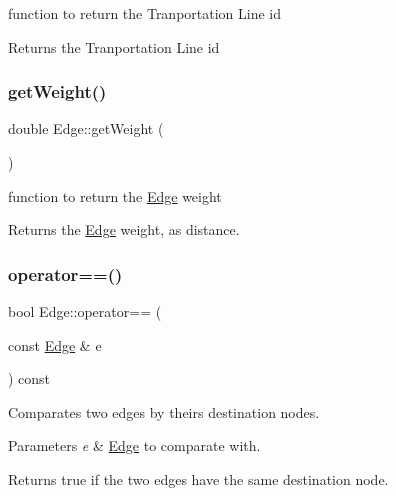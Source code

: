 function to return the Tranportation Line id 

\begin{DoxyReturn}{Returns}
the Tranportation Line id 
\end{DoxyReturn}
\mbox{\label{class_edge_a3a776c1ccafacdbdb10fdedd9cb329af}} 
\subsubsection{\texorpdfstring{get\+Weight()}{getWeight()}}
{\footnotesize\ttfamily double Edge\+::get\+Weight (\begin{DoxyParamCaption}{ }\end{DoxyParamCaption})\hspace{0.3cm}{\ttfamily [inline]}}



function to return the \hyperlink{class_edge}{Edge} weight 

\begin{DoxyReturn}{Returns}
the \hyperlink{class_edge}{Edge} weight, as distance. 
\end{DoxyReturn}
\mbox{\label{class_edge_a38c76499b14c3ada34f0b485f6e2a5bb}} 
\subsubsection{\texorpdfstring{operator==()}{operator==()}}
{\footnotesize\ttfamily bool Edge\+::operator== (\begin{DoxyParamCaption}\item[{const \hyperlink{class_edge}{Edge} \&}]{e }\end{DoxyParamCaption}) const}



Comparates two edges by theirs destination nodes. 


\begin{DoxyParams}{Parameters}
{\em e} & \hyperlink{class_edge}{Edge} to comparate with. \\
\hline
\end{DoxyParams}
\begin{DoxyReturn}{Returns}
true if the two edges have the same destination node. 
\end{DoxyReturn}
\mbox{\label{class_edge_ad22476bee43fa688e83428d47979faf1}} 
